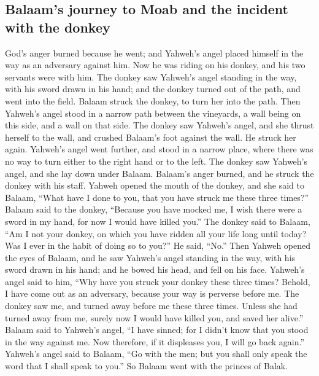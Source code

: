 \begin{paracol}{2}
\begin{otherlanguage}{english}
{\subsection{Balaam's journey to Moab and the incident with the
donkey}\label{balaams-journey-to-moab-and-the-incident-with-the-donkey}}

 God's anger burned because he went; and Yahweh's angel
placed himself in the way as an adversary against him. Now he was riding
on his donkey, and his two servants were with him.  The
donkey saw Yahweh's angel standing in the way, with his sword drawn in
his hand; and the donkey turned out of the path, and went into the
field. Balaam struck the donkey, to turn her into the path.
 Then Yahweh's angel stood in a narrow path between the
vineyards, a wall being on this side, and a wall on that side.
 The donkey saw Yahweh's angel, and she thrust herself to
the wall, and crushed Balaam's foot against the wall. He struck her
again.  Yahweh's angel went further, and stood in a
narrow place, where there was no way to turn either to the right hand or
to the left.  The donkey saw Yahweh's angel, and she lay
down under Balaam. Balaam's anger burned, and he struck the donkey with
his staff.  Yahweh opened the mouth of the donkey, and
she said to Balaam, ``What have I done to you, that you have struck me
these three times?''  Balaam said to the donkey,
``Because you have mocked me, I wish there were a sword in my hand, for
now I would have killed you.''  The donkey said to
Balaam, ``Am I not your donkey, on which you have ridden all your life
long until today? Was I ever in the habit of doing so to you?'' He said,
``No.''  Then Yahweh opened the eyes of Balaam, and he
saw Yahweh's angel standing in the way, with his sword drawn in his
hand; and he bowed his head, and fell on his face. 
Yahweh's angel said to him, ``Why have you struck your donkey these
three times? Behold, I have come out as an adversary, because your way
is perverse before me.  The donkey saw me, and turned
away before me these three times. Unless she had turned away from me,
surely now I would have killed you, and saved her alive.''
 Balaam said to Yahweh's angel, ``I have sinned; for I
didn't know that you stood in the way against me. Now therefore, if it
displeases you, I will go back again.''  Yahweh's angel
said to Balaam, ``Go with the men; but you shall only speak the word
that I shall speak to you.'' So Balaam went with the princes of Balak.


\end{otherlanguage}
\end{paracol}
